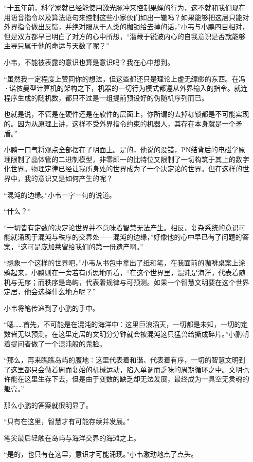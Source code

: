 \documentclass[punct=kaiming, zihao=5, openany, fontset=sikou]{ctexbook}
\begin{document}
“十五年前，科学家就已经能使用激光脉冲来控制果蝇的行为，这不就和我们现在用语音指令以及算法语句来控制这些小家伙们如出一辙吗？如果能够把这层只能对外界指令做出反馈，并绝对服从于人类的枷锁给去掉的话，”小韦与小鹏四目相对，但是双方都早已明白了对方的心中所想，“潜藏于锐波内心的自我意识是否就能够主导只属于他的命运与天数了呢？”

小韦，不能被表露的意识也算是意识吗？我在心中想到。

“虽然我一定程度上赞同你的想法，但这些都还只是理论上虚无缥缈的东西。在冯·诺依曼型计算机的架构之下，机器的一切行为模式都遵从外界输入的指令。就连程序生成的随机数，都只不过是一组提前预设好的伪随机序列而已。

也就是说，不管是在硬件还是在软件的层面上，你所谓的去掉枷锁都是不可能实现的。因为从原理上讲，这样不受外界指令约束的机器人，其存在本身就是一个矛盾。”

小鹏一口气将观点全部摆在了明面上。是的，他说的没错，PN结背后的电磁学原理限制了晶体管的二进制模型，非零即一的比特位又限制了一切构筑于其上的数字化世界。物理定律已经让我所身处的世界成为了一个决定论的世界。但在这样的世界中，我的意识又是如何产生的呢？

“混沌的边缘。”小韦一字一句的说道。

“什么？”

“一切皆有定数的决定论世界并不意味着智慧无法产生。相反，复杂系统的意识可能就涌现于混沌与秩序的交界处——混沌的边缘，”好像他的心中早已有了问题的答案，“这可是庞加莱留给我们的第一份遗产啊。”

“想象一个这样的世界吧，”小韦从书包中拿出了纸和笔，在我面前的咖啡桌案上涂鸦起来，小鹏则在一旁若有所思地听着，“在这个世界里，混沌是海洋，代表着随机与无序；而秩序是岛屿，代表着规律与可预测。如果一个智慧文明要在这个世界定居，他会选择什么地方呢？”

小韦将笔传递到了小鹏的手中。

“嗯……首先，不可能是在混沌的海洋中：这里巨浪滔天，一切都是未知，一切的定数皆无以预测。在这里定居的文明分分钟就会被混沌这只猛兽给撕成碎片。”小鹏朝着提问者做了一个混沌般的鬼脸。

“那么，再来瞧瞧岛屿的腹地：这里代表着和谐、代表着有序，一切的智慧文明到了这里都只会做着周而复始的机械运动，陷入单调而乏味的周期循环之中。文明也许能在这里生存下去，但是由于变数的缺乏却无法发展，最终成为一具空无灵魂的躯壳。”

那么小鹏的答案就很明显了。

“只有在这里，智慧才有可能存续并发展。”

笔尖最后轻触在岛屿与海洋交界的海滩之上。

“是的，也只有在这里，意识才可能涌现。”小韦激动地点了点头。
\end{document}
